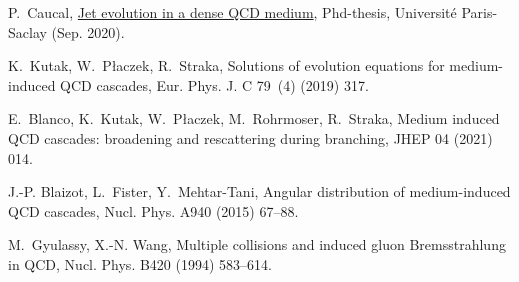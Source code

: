 \documentclass[preprint,12pt]{elsarticle}
\begin{document}
\begin{thebibliography}{99}
P.~Caucal, \href{https://tel.archives-ouvertes.fr/tel-03081993}{{Jet evolution
  in a dense QCD medium}}, Phd-thesis, {Universit{\'e} Paris-Saclay} (Sep.
  2020).{}

K.~Kutak, W.~P\l{}aczek, R.~Straka, {Solutions of evolution equations for
  medium-induced QCD cascades}, Eur. Phys. J. C 79~(4) (2019) 317.
{}

E.~Blanco, K.~Kutak, W.~P\l{}aczek, M.~Rohrmoser, R.~Straka, {Medium induced
  QCD cascades: broadening and rescattering during branching}, JHEP 04 (2021)
  014.
{}

J.-P. Blaizot, L.~Fister, Y.~Mehtar-Tani, {Angular distribution of
  medium-induced QCD cascades}, Nucl. Phys. A940 (2015) 67--88.
{}

M.~Gyulassy, X.-N. Wang, {Multiple collisions and induced gluon Bremsstrahlung
  in QCD}, Nucl. Phys. B420 (1994) 583--614.
  {}%
\end{thebibliography}
\end{document}
